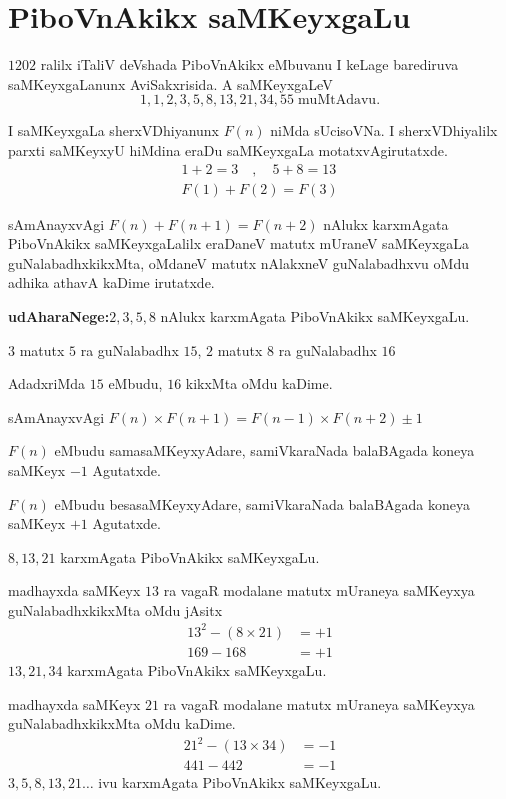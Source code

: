 \chapter{PiboVnAkikx saMKeyxgaLu}
\vskip -20pt

$1202$ ralilx iTaliV deVshada PiboVnAkikx eMbuvanu I keLage barediruva saMKeyxgaLanunx AviSakxrisida. A saMKeyxgaLeV
$$
1,1,2,3,5,8,13,21,34,55 \;  \text{muMtAdavu}.
$$ 

I saMKeyxgaLa sherxVDhiyanunx $F(n)$ niMda sUcisoVNa. I sherxVDhiyalilx parxti saMKeyxyU hiMdina eraDu saMKeyxgaLa motatxvAgirutatxde.
\begin{gather*}
1+2=3\quad , \quad 5+8=13\\
F(1)+F(2) = F(3)
 \end{gather*}

sAmAnayxvAgi $F(n) + F(n+1) = F(n+2)$ nAlukx karxmAgata PiboVnAkikx saMKeyxgaLalilx eraDaneV matutx mUraneV saMKeyxgaLa guNalabadhxkikxMta, oMdaneV matutx nAlakxneV guNalabadhxvu oMdu adhika athavA kaDime irutatxde.

\textbf{udAharaNege:}\quad $2,3,5,8$ nAlukx karxmAgata PiboVnAkikx saMKeyxgaLu.

$3$ matutx $5$ ra guNalabadhx $15$, $2$ matutx $8$ ra guNalabadhx $16$  

AdadxriMda $15$ eMbudu, $16$ kikxMta oMdu kaDime.

sAmAnayxvAgi $F(n)\times F(n+1) = F(n-1)\times F(n+2)\pm1$ 

$F(n)$ eMbudu samasaMKeyxyAdare, samiVkaraNada balaBAgada koneya saMKeyx $-1$ Agutatxde.

$F(n)$ eMbudu besasaMKeyxyAdare, samiVkaraNada balaBAgada koneya saMKeyx $+1$ Agutatxde.

$8,13,21$ karxmAgata PiboVnAkikx saMKeyxgaLu.

madhayxda saMKeyx $13$ ra vagaR modalane matutx mUraneya saMKeyxya guNalabadhxkikxMta oMdu jAsitx
\begin{align*}
13^2-(8\times 21) &=+1\\
169-168 &= +1
\end{align*}
$13,21,34$ karxmAgata PiboVnAkikx saMKeyxgaLu. 

madhayxda saMKeyx $21$ ra vagaR  modalane  matutx mUraneya saMKeyxya guNalabadhxkikxMta oMdu kaDime.
\begin{align*}
21^2 - (13\times 34) &= -1 \\
441-442 &= -1
\end{align*}
$3,5,8,13,21\hdots$ ivu karxmAgata PiboVnAkikx saMKeyxgaLu.


